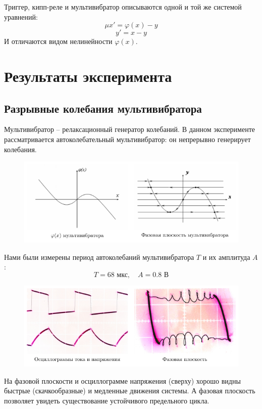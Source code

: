 \documentclass[a4paper,14pt]{extarticle}
\begin{document}
Триггер, кипп-реле и мультивибратор описываются одной и той же системой уравнений:
$$\mu x' = \varphi(x) - y $$
$$y' = x - y$$
И отличаются видом нелинейности $\varphi(x)$.

\section{Результаты эксперимента}
\subsection{Разрывные колебания мультивибратора}
Мультивибратор -- релаксационный генератор колебаний. В данном эксперименте рассматривается автоколебательный мультивибратор: он непрерывно генерирует колебания. 
   \begin{figure}[H]
    \centering
       \includegraphics[width=1\textwidth]{plot/ris1}
       \vspace{-1.4em}
     \caption{}
     \label{fig:dummy}
	\end{figure}
Нами были измерены период автоколебаний мультивибратора $T$ и их амплитуда $A$: 
\begin{equation}
	T=68 \text{ мкс}, \quad A = 0.8 \text{ В}
\end{equation}
   \begin{figure}[H]
    \centering
       \includegraphics[width=1\textwidth]{plot/multi}
       \vspace{-1.4em}
     \caption{}
     \label{fig:dummy}
	\end{figure}
На фазовой плоскости и осциллограмме напряжения (сверху) хорошо видны быстрые (скачкообразные) и медленные движения системы. А фазовая плоскость позволяет увидеть существование устойчивого предельного цикла.
\end{document}

